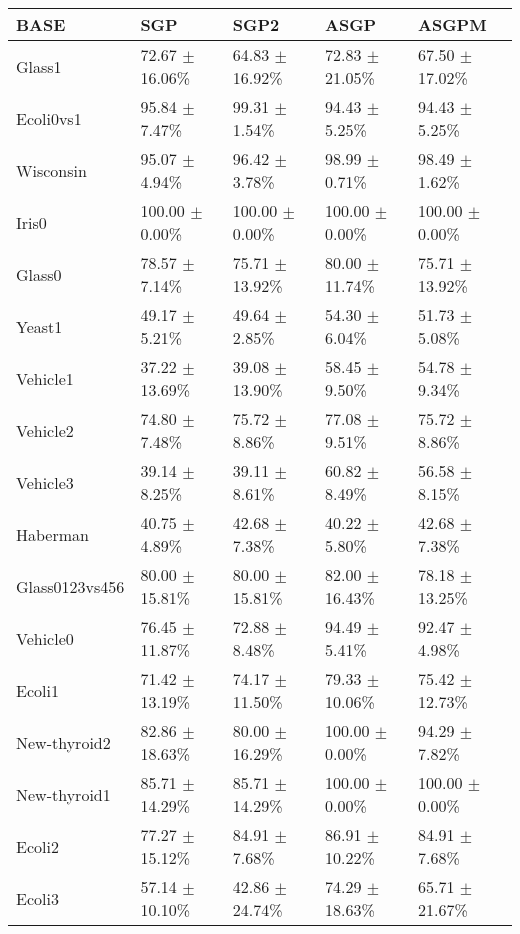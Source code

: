
\begin{table}[H]
\begin{center}
\begin{tabular}{|l|l|l|l|l|}
\hline
BASE	&	SGP	&	SGP2	&	ASGP	&	ASGPM	\\
\hline
Glass1	&	72.67 $\pm$16.06\%	&	64.83 $\pm$16.92\%	&	72.83 $\pm$21.05\%	&	67.50 $\pm$17.02\%	\\
\hline
Ecoli0vs1	&	95.84 $\pm$7.47\%	&	99.31 $\pm$1.54\%	&	94.43 $\pm$5.25\%	&	94.43 $\pm$5.25\%	\\
\hline
Wisconsin	&	95.07 $\pm$4.94\%	&	96.42 $\pm$3.78\%	&	98.99 $\pm$0.71\%	&	98.49 $\pm$1.62\%	\\
\hline
Iris0	&	100.00 $\pm$0.00\%	&	100.00 $\pm$0.00\%	&	100.00 $\pm$0.00\%	&	100.00 $\pm$0.00\%	\\
\hline
Glass0	&	78.57 $\pm$7.14\%	&	75.71 $\pm$13.92\%	&	80.00 $\pm$11.74\%	&	75.71 $\pm$13.92\%	\\
\hline
Yeast1	&	49.17 $\pm$5.21\%	&	49.64 $\pm$2.85\%	&	54.30 $\pm$6.04\%	&	51.73 $\pm$5.08\%	\\
\hline
Vehicle1	&	37.22 $\pm$13.69\%	&	39.08 $\pm$13.90\%	&	58.45 $\pm$9.50\%	&	54.78 $\pm$9.34\%	\\
\hline
Vehicle2	&	74.80 $\pm$7.48\%	&	75.72 $\pm$8.86\%	&	77.08 $\pm$9.51\%	&	75.72 $\pm$8.86\%	\\
\hline
Vehicle3	&	39.14 $\pm$8.25\%	&	39.11 $\pm$8.61\%	&	60.82 $\pm$8.49\%	&	56.58 $\pm$8.15\%	\\
\hline
Haberman	&	40.75 $\pm$4.89\%	&	42.68 $\pm$7.38\%	&	40.22 $\pm$5.80\%	&	42.68 $\pm$7.38\%	\\
\hline
Glass0123vs456	&	80.00 $\pm$15.81\%	&	80.00 $\pm$15.81\%	&	82.00 $\pm$16.43\%	&	78.18 $\pm$13.25\%	\\
\hline
Vehicle0	&	76.45 $\pm$11.87\%	&	72.88 $\pm$8.48\%	&	94.49 $\pm$5.41\%	&	92.47 $\pm$4.98\%	\\
\hline
Ecoli1	&	71.42 $\pm$13.19\%	&	74.17 $\pm$11.50\%	&	79.33 $\pm$10.06\%	&	75.42 $\pm$12.73\%	\\
\hline
New-thyroid2	&	82.86 $\pm$18.63\%	&	80.00 $\pm$16.29\%	&	100.00 $\pm$0.00\%	&	94.29 $\pm$7.82\%	\\
\hline
New-thyroid1	&	85.71 $\pm$14.29\%	&	85.71 $\pm$14.29\%	&	100.00 $\pm$0.00\%	&	100.00 $\pm$0.00\%	\\
\hline
Ecoli2	&	77.27 $\pm$15.12\%	&	84.91 $\pm$7.68\%	&	86.91 $\pm$10.22\%	&	84.91 $\pm$7.68\%	\\
\hline
Ecoli3	&	57.14 $\pm$10.10\%	&	42.86 $\pm$24.74\%	&	74.29 $\pm$18.63\%	&	65.71 $\pm$21.67\%	\\

\end{tabular}
\end{center}
\end{table}
